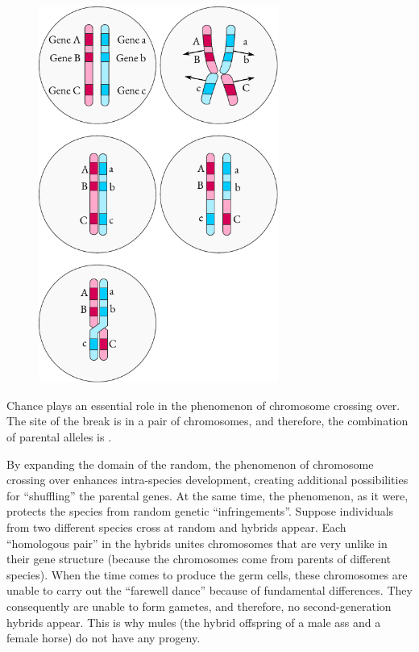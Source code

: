 \begin{figure}[!ht]
\centering
\includegraphics[width=0.7\textwidth]{figures/genes3.pdf}
\end{figure}


Chance plays an essential role in the phenomenon of chromosome
crossing over. The site of the break is  in a pair of chromosomes, and therefore, the combination of parental alleles is  .

By expanding the domain of the random, the phenomenon of
chromosome crossing over enhances intra-species development, creating
additional possibilities for ``shuffling'' the parental genes. At the same
time, the phenomenon, as it were, protects the species from random
genetic ``infringements''. Suppose individuals from two different species
cross at random and hybrids appear. Each ``homologous pair'' in the
hybrids unites chromosomes that are very unlike in their gene structure
(because the chromosomes come from parents of different species). When
the time comes to produce the germ cells, these chromosomes are
unable to carry out the ``farewell dance'' because of fundamental
differences. They consequently are unable to form gametes, and therefore,
no second-generation hybrids appear. This is why mules (the
hybrid offspring of a male ass and a female horse) do not have any
progeny.

